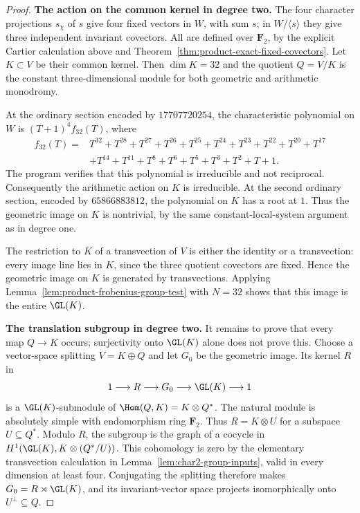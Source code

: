 \begin{proof}
\par\smallskip\noindent\textbf{The action on the common kernel in degree two.}
The four character projections $s_\chi$ of $s$ give four fixed
vectors in $W$, with sum $s$; in $W/\langle s\rangle$ they give
three independent invariant covectors.  All are defined over
$\mathbf F_2$, by the explicit Cartier calculation above and
Theorem~\ref{thm:product-exact-fixed-covectors}.
Let $K\subset V$ be their common kernel.  Then $\dim K=32$ and
the quotient $Q=V/K$ is the constant three-dimensional module
for both geometric and arithmetic monodromy.

At the ordinary section encoded by $17707720254$, the characteristic
polynomial on $W$ is $(T+1)^4f_{32}(T)$, where
\[
\begin{split}
 f_{32}(T)={}&T^{32}+T^{28}+T^{27}+T^{26}+T^{25}+T^{24}
             +T^{23}+T^{22}+T^{20}+T^{17}\\
            &+T^{14}+T^{11}+T^8+T^6+T^5+T^3+T^2+T+1.
\end{split}
\]
The program verifies that this polynomial is irreducible and not
reciprocal.  Consequently the arithmetic action on $K$ is
irreducible.  At the second ordinary section, encoded by
$65866883812$, the polynomial on $K$ has a root at $1$.
Thus the geometric image on $K$ is nontrivial, by the same
constant-local-system argument as in degree one.

The restriction to $K$ of a transvection of $V$ is either the
identity or a transvection: every image line lies in $K$, since
the three quotient covectors are fixed.  Hence the geometric
image on $K$ is generated by transvections.  Applying
Lemma~\ref{lem:product-frobenius-group-test} with $N=32$ shows
that this image is the entire $\GL(K)$.

\par\smallskip\noindent\textbf{The translation subgroup in degree two.}
It remains to prove that every map $Q\to K$ occurs; surjectivity
onto $\GL(K)$ alone does not prove this.
Choose a vector-space splitting $V=K\oplus Q$ and let $G_0$ be
the geometric image.  Its kernel $R$ in
\[
 1\longrightarrow R\longrightarrow G_0
          \longrightarrow\GL(K)\longrightarrow1
\]
is a $\GL(K)$-submodule of $\Hom(Q,K)=K\otimes Q^*$.
The natural module is absolutely simple with endomorphism ring
$\mathbf F_2$.  Thus $R=K\otimes U$ for a subspace $U\subseteq Q^*$.
Modulo $R$, the subgroup is the graph of a cocycle in
$H^1(\GL(K),K\otimes(Q^*/U))$.
This cohomology is zero by the elementary transvection calculation
in Lemma~\ref{lem:char2-group-inputs}, valid in every dimension
at least four.  Conjugating the splitting therefore makes
$G_0=R\rtimes\GL(K)$, and its invariant-vector space projects
isomorphically onto $U^\perp\subseteq Q$.


\end{proof}
